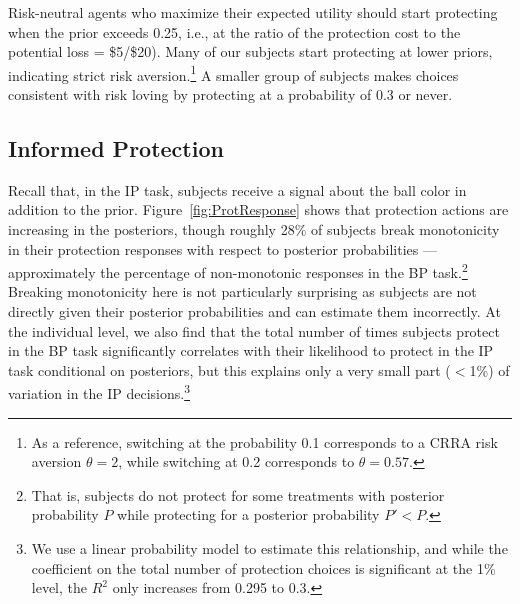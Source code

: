\documentclass[12pt,a4paper]{article}
\begin{document}
Risk-neutral agents who maximize their expected utility should start protecting when the prior exceeds 0.25, i.e., at the ratio of the protection cost to the potential loss = \$5/\$20). Many of our subjects start protecting at lower priors, indicating strict risk aversion.\footnote{As a reference, switching at the probability 0.1 corresponds to a CRRA risk aversion $\theta=2$, while switching at 0.2 corresponds to $\theta=0.57$.}  A smaller group of subjects makes choices consistent with risk loving by protecting at a probability of 0.3 or never. 

\subsection{Informed Protection}

Recall that, in the IP task, subjects receive a signal about the ball color in addition to the prior. 
Figure~\ref{fig:ProtResponse} shows that protection actions are increasing in the posteriors, though roughly 28\% of subjects break monotonicity in their protection responses with respect to posterior probabilities --- approximately the percentage of non-monotonic responses in the BP task.\footnote{That is, subjects do not protect for some treatments with posterior probability $P$ while protecting for a posterior probability $P'<P$.}  Breaking monotonicity here is not particularly surprising as subjects are not directly given their posterior probabilities and can estimate them incorrectly. At the individual level, we also find that the total number of times subjects protect in the BP task significantly correlates with their likelihood to protect in the IP task conditional on posteriors, but this explains only a very small part ($<$1\%) of variation in the IP decisions.\footnote{We use a linear probability model to estimate this relationship, and while the coefficient on the total number of protection choices is significant at the 1\% level, the $R^2$ only increases from 0.295 to 0.3.} 


\end{document}
